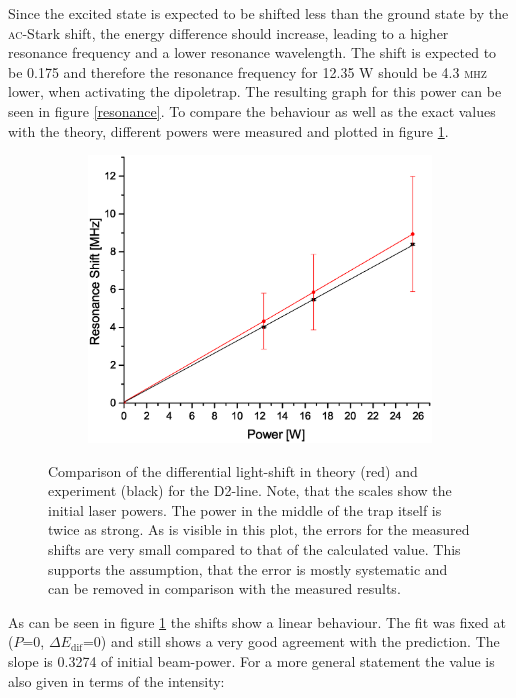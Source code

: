 Since the excited state is expected to be shifted less than the ground state by the \textsc{ac}-Stark shift, the energy difference should increase, leading to a higher resonance frequency and a lower resonance wavelength. The shift is expected to be 0.175  and therefore the resonance frequency for 12.35 \textsc{W} should be 4.3 \textsc{mhz} lower, when activating the dipoletrap. The resulting graph for this power can be seen in figure \ref{resonance}. To compare the behaviour as well as the exact values with the theory, different powers were measured and plotted in figure \ref{shifts}. 

\begin{figure}[h]
\centering
\begin{subfigure}[b]{0.8\textwidth}
                \includegraphics[width=\textwidth]{Shift2}
\end{subfigure}
\caption{Comparison of the differential light-shift in theory (red) and experiment (black) for the D2-line. Note, that the scales show the initial laser powers. The power in the middle of the trap itself is twice as strong. As is visible in this plot, the errors for the measured shifts are very small compared to that of the calculated value. This supports the assumption, that the error is mostly systematic and can be removed in comparison with the measured results.}
\label{shifts}
\end{figure}
As can be seen in figure \ref{shifts} the shifts show a linear behaviour. The fit was fixed at ($P$=$0$, $\Delta E_\mathrm{dif}$=$0$) and still shows a very good  agreement with the prediction. The slope is 0.3274  of initial beam-power. For a more general statement the value is also given in terms of the intensity:
